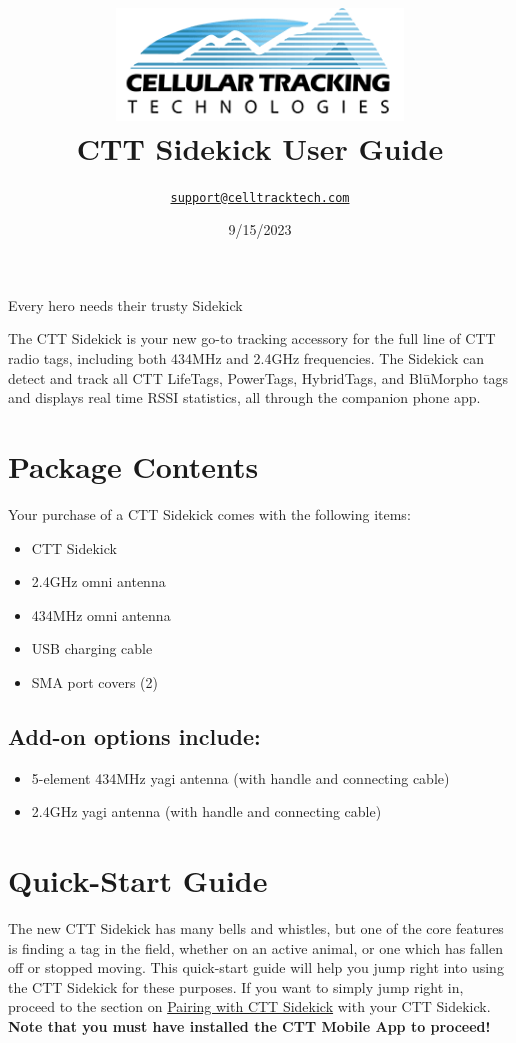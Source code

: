 \documentclass[
]{article}
\title{\includegraphics[width=3in,height=\textheight]{./images/ctt_logo.png}\\
CTT Sidekick User Guide}
\author{\href{mailto:support@celltracktech.com}{\nolinkurl{support@celltracktech.com}}}
\date{9/15/2023}
\providecommand{\tightlist}{%
  \setlength{\itemsep}{0pt}\setlength{\parskip}{0pt}}
\begin{document}
\maketitle

{
\setcounter{tocdepth}{2}
\tableofcontents
}
\newpage

Every hero needs their trusty Sidekick

The CTT Sidekick is your new go-to tracking accessory for the full line
of CTT radio tags, including both 434MHz and 2.4GHz frequencies. The
Sidekick can detect and track all CTT LifeTags, PowerTags, HybridTags,
and BlūMorpho tags and displays real time RSSI statistics, all through
the companion phone app.

\hypertarget{package-contents}{%
\section{Package Contents}\label{package-contents}}

Your purchase of a CTT Sidekick comes with the following items:

\begin{itemize}
\tightlist
\item
  CTT Sidekick
\item
  2.4GHz omni antenna
\item
  434MHz omni antenna
\item
  USB charging cable
\item
  SMA port covers (2)
\end{itemize}

\hypertarget{add-on-options-include}{%
\subsection{Add-on options include:}\label{add-on-options-include}}

\begin{itemize}
\tightlist
\item
  5-element 434MHz yagi antenna (with handle and connecting cable)
\item
  2.4GHz yagi antenna (with handle and connecting cable)
\end{itemize}

\hypertarget{quick-start-guide}{%
\section{Quick-Start Guide}\label{quick-start-guide}}

The new CTT Sidekick has many bells and whistles, but one of the core
features is finding a tag in the field, whether on an active animal, or
one which has fallen off or stopped moving. This quick-start guide will
help you jump right into using the CTT Sidekick for these purposes. If
you want to simply jump right in, proceed to the section on
\protect\hyperlink{pairing-with-ctt-sidekick}{Pairing with CTT Sidekick}
with your CTT Sidekick. \textbf{Note that you must have installed the
CTT Mobile App to proceed!}
\end{document}
